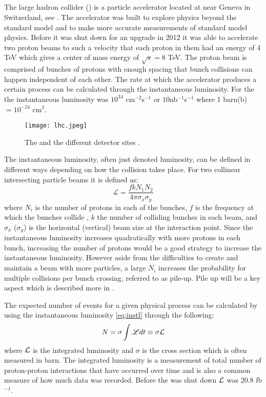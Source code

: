 \subsection{\abbrLHC}
The large hadron collider (\abbrLHC) is a particle accelerator located at \abbrCERN near Geneva in Switzerland, see . The accelerator was built to explore physics beyond the standard model and to make more accurate measurements of standard model physics. Before it was shut down for an upgrade in 2012 it was able to accelerate two proton beams to such a velocity that each proton in them had an energy of 4 TeV which gives a center of mass energy of $\sqrt{s}=8$ TeV. The proton beam is comprised of bunches of protons with enough spacing that bunch collisions can happen independent of each other. The rate at which the accelerator produces a certain process can be calculated through the instantaneous luminosity. For the \abbrLHC the instantaneous luminosity was $10^{34}$ cm$^{-2}$s$^{-1}$ \citep{lumires} or $10$nb$^{-1}$s$^{-1}$ where 1 barn(b)$=10^{-24}$ cm$^2$.
\begin{figure}[H]
\begin{center}
\texttt{[image: lhc.jpeg]}
\caption{The \abbrLHC and the different detector sites \citep{lhcimage}.}
\label{fig:lhc}
\end{center}
\end{figure}
The instantaneous luminosity, often just denoted luminosity, can be defined in different ways depending on how the collision takes place. For two collinear intersecting particle beams it is defined as:
\begin{equation}\label{eq:instl}
\mathscr{L} = \frac{fkN_1 N_2}{4\pi \sigma_x \sigma_y}
\end{equation}
where $N_i$ is the number of protons in each of the bunches, $f$ is the frequency at which the bunches collide , $k$ the number of colliding bunches in each beam, and $\sigma_x$ ($\sigma_y$) is the horizontal (vertical) beam size at the interaction point. Since the instantaneous luminosity increases quadratically with more protons in each bunch, increasing the number of protons would be a good strategy to increase the instantaneous luminosity. However aside from the difficulties to create and maintain a beam with more particles, a large $N_i$ increases the probability for multiple collisions per bunch crossing, referred to as pile-up. Pile up will be a key aspect which is described more in . 

The expected number of events for a given physical process can be calculated by using the instantaneous luminosity \eqref{eq:instl} through the following:
\begin{equation}\label{eq:Numevents}
N=\sigma \int \mathscr{L} dt \equiv \sigma \mathcal{L}
\end{equation}
where $\mathcal{L}$ is the integrated luminosity and $\sigma$ is the cross section which is often measured in barn.
The integrated luminosity is a measurement of total number of proton-proton interactions that have occurred over time and is also a common measure of how much data was recorded. Before the \abbrLHC was shut down $\mathcal{L}$ was 20.8 fb$^{-1}$.

